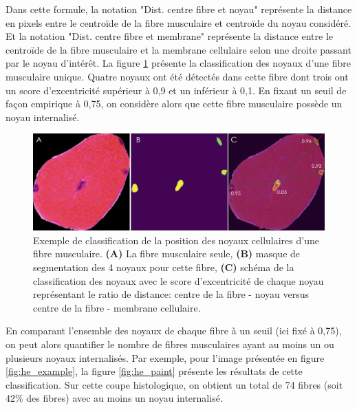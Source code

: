 Dans cette formule, la notation "Dist. centre fibre et noyau" représente la distance en pixels entre le centroïde de la fibre musculaire et centroïde du noyau considéré. Et la notation "Dist. centre fibre et membrane" représente la distance entre le centroïde de la fibre musculaire et la membrane cellulaire selon une droite passant par le noyau d'intérêt. La figure \ref{fig:he_single_nuc}  présente la classification des noyaux d'une fibre musculaire unique. Quatre noyaux ont été détectés dans cette fibre dont trois ont un score d'excentricité supérieur à 0,9 et un inférieur à 0,1. En fixant un seuil de façon empirique à 0,75, on considère alors que cette fibre musculaire possède un noyau internalisé.
\begin{figure}[!ht]
 \centering
 \includegraphics[width=1\textwidth]{figures/he_single_nuc.png}
 \caption[Exemple de classification de la position des noyaux]{Exemple de classification de la position des noyaux cellulaires d'une fibre musculaire. \textbf{(A)} La fibre musculaire seule,\textbf{ (B)} masque de segmentation des 4 noyaux pour cette fibre,\textbf{ (C)} schéma de la classification des noyaux avec le score d'excentricité de chaque noyau représentant le ratio de distance: centre de la fibre - noyau versus centre de la fibre - membrane cellulaire.}
 \label{fig:he_single_nuc}
\end{figure}
En comparant l'ensemble des noyaux de chaque fibre à un seuil (ici fixé à 0,75), on peut alors quantifier le nombre de fibres musculaires ayant au moins un ou plusieurs noyaux internalisés. Par exemple, pour l'image présentée en figure \ref{fig:he_example}, la figure \ref{fig:he_paint} présente les résultats de cette classification. Sur cette coupe histologique, on obtient un total de 74 fibres (soit 42\% des fibres) avec au moins un noyau internalisé.

